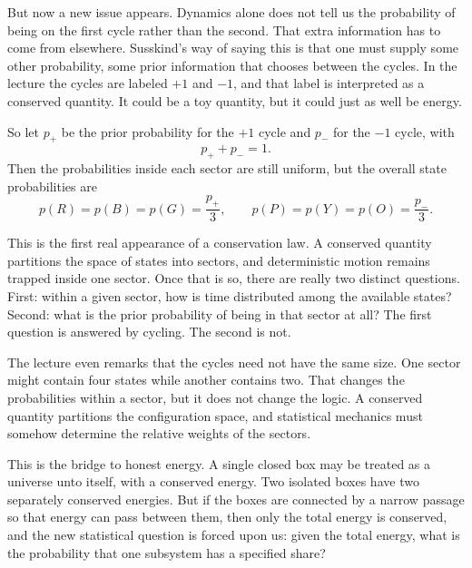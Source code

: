But now a new issue appears. Dynamics alone does not tell us the probability of being on the first cycle rather than the second. That extra information has to come from elsewhere. Susskind's way of saying this is that one must supply some other probability, some prior information that chooses between the cycles. In the lecture the cycles are labeled \(+1\) and \(-1\), and that label is interpreted as a conserved quantity. It could be a toy quantity, but it could just as well be energy.

So let \(p_{+}\) be the prior probability for the \(+1\) cycle and \(p_{-}\) for the \(-1\) cycle, with
\begin{equation}
p_{+}+p_{-}=1.
\end{equation}
Then the probabilities inside each sector are still uniform, but the overall state probabilities are
\begin{equation}
p(R)=p(B)=p(G)=\frac{p_{+}}{3},
\qquad
p(P)=p(Y)=p(O)=\frac{p_{-}}{3}.
\end{equation}

This is the first real appearance of a conservation law. A conserved quantity partitions the space of states into sectors, and deterministic motion remains trapped inside one sector. Once that is so, there are really two distinct questions. First: within a given sector, how is time distributed among the available states? Second: what is the prior probability of being in that sector at all? The first question is answered by cycling. The second is not.

The lecture even remarks that the cycles need not have the same size. One sector might contain four states while another contains two. That changes the probabilities within a sector, but it does not change the logic. A conserved quantity partitions the configuration space, and statistical mechanics must somehow determine the relative weights of the sectors.

This is the bridge to honest energy. A single closed box may be treated as a universe unto itself, with a conserved energy. Two isolated boxes have two separately conserved energies. But if the boxes are connected by a narrow passage so that energy can pass between them, then only the total energy is conserved, and the new statistical question is forced upon us: given the total energy, what is the probability that one subsystem has a specified share?

